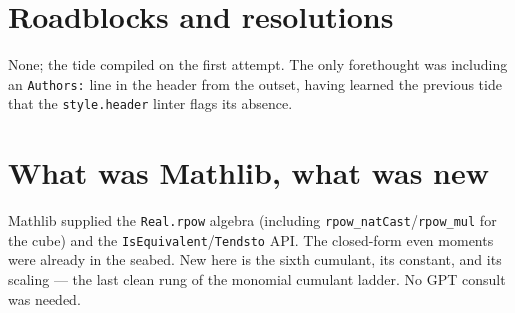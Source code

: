 \documentclass[11pt]{article}
\begin{document}
\section{Roadblocks and resolutions}
None; the tide compiled on the first attempt. The only forethought was including an \texttt{Authors:}
line in the header from the outset, having learned the previous tide that the \texttt{style.header}
linter flags its absence.
\section{What was Mathlib, what was new}
Mathlib supplied the \texttt{Real.rpow} algebra (including \texttt{rpow\_natCast}/\texttt{rpow\_mul} for
the cube) and the \texttt{IsEquivalent}/\texttt{Tendsto} API. The closed-form even moments were already
in the seabed. New here is the sixth cumulant, its constant, and its scaling --- the last clean rung of
the monomial cumulant ladder. No GPT consult was needed.
\end{document}
